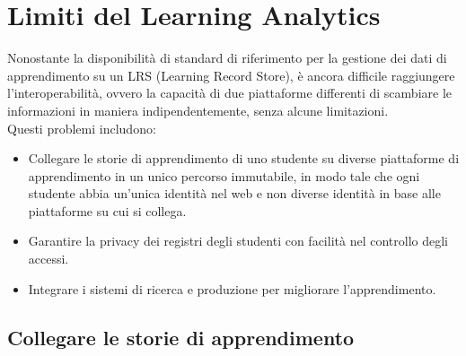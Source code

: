\section{Limiti del Learning Analytics}
Nonostante la disponibilità di standard di riferimento per la gestione dei dati di apprendimento su un LRS (Learning Record Store), è ancora difficile raggiungere l'interoperabilità,
ovvero la capacità di due piattaforme differenti di scambiare le informazioni in maniera indipendentemente, senza alcune limitazioni.
\\Questi problemi includono:
\begin{itemize}
    \item Collegare le storie di apprendimento di uno studente su diverse piattaforme di apprendimento in un unico percorso immutabile, in modo tale che ogni studente abbia un'unica identità nel web e non diverse identità in base alle piattaforme su cui si collega.
    \item Garantire la privacy dei registri degli studenti con facilità nel controllo degli accessi.
    \item Integrare i sistemi di ricerca e produzione per migliorare l'apprendimento.
\end{itemize}

\subsection{Collegare le storie di apprendimento }
